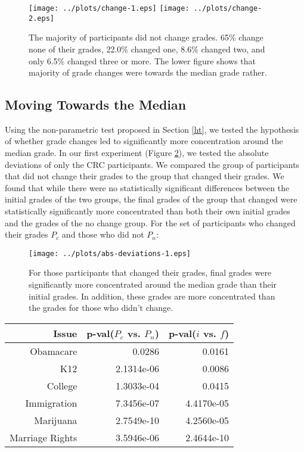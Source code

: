 \begin{figure}[h]
\hspace*{-2em}
    \texttt{[image: ../plots/change-1.eps]}
    \hspace*{-2em}
    \texttt{[image: ../plots/change-2.eps]}
      \caption{The majority of participants did not change grades. 65\% change none of their grades, 22.0\% changed one, 8.6\% changed two, and only 6.5\% changed three or more. The lower figure shows that majority of grade changes were towards the median grade rather.}
      \label{change-1}
\end{figure}

\subsection{Moving Towards the Median}
Using the non-parametric test proposed in Section \ref{ht}, we tested the hypothesis of whether grade changes led to significantly more concentration around the median grade.
In our first experiment (Figure \ref{mdev-1}), we tested the absolute deviations of only the CRC participants.
We compared the group of participants that did not change their grades to the group that changed their grades.
We found that while there were no statistically significant differences between the initial grades of the two groups, the final grades of the group that changed were statistically significantly more concentrated than both their own initial grades and the grades of the no change group.
For the set of participants who changed their grades $P_c$ and those who did not $P_n$:
\begin{figure}[h]
\centering
    \texttt{[image: ../plots/abs-deviations-1.eps]}
      \caption{For those participants that changed their grades, final grades were significantly more concentrated around the median grade than their initial grades. In addition, these grades are more concentrated than the grades for those who didn't change.}
      \label{mdev-1}
\end{figure}

{\centering
\scriptsize
\begin{tabular}[!ht] { r | r | r }
\label{dev-2}
  Issue & p-val($P_c$ vs. $P_n$) & p-val($i$ vs. $f$) \\
  \hline
  \hline
  Obamacare &  0.0286 & 0.0161 \\
  \hline
  K12 & 2.1314e-06 &  0.0086 \\
  \hline
  College & 1.3033e-04 & 0.0415 \\
  \hline
  Immigration & 7.3456e-07 &4.4170e-05\\
  \hline
  Marijuana & 2.7549e-10 & 4.2560e-05\\
  \hline
  Marriage Rights & 3.5946e-06 & 2.4644e-10 \\
\end{tabular}\\[1\baselineskip]
}

